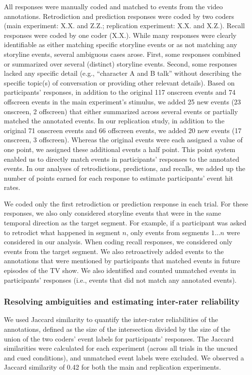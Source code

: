 \documentclass[10pt]{article}
\begin{document}
 All responses were manually coded and matched to events from the video annotations. Retrodiction and prediction responses were coded by two coders (main experiment: X.X. and Z.Z.; replication experiment: X.X. and X.Z.). Recall responses were coded by one coder (X.X.). While many responses were clearly identifiable as either matching specific storyline events or as not matching any storyline events, several ambiguous cases arose. First, some responses combined or summarized over several (distinct) storyline events. Second, some responses lacked any specific detail (e.g., ``character A and B talk'' without describing the specific topic(s) of conversation or providing other relevant details). Based on participants' responses, in addition to the original 117 onscreen events and 74 offscreen events in the main experiment's stimulus, we added 25 new events (23 onscreen, 2 offscreen) that either summarized across several events or partially matched the annotated events. In our replication study, in addition to the original 71 onscreen events and 66 offscreen events, we added 20 new events (17 onscreen, 3 offscreen). Whereas the original events were each assigned a value of one point, we assigned these additional events a half point. This point system enabled us to directly match events in participants' responses to the annotated events. In our analyses of retrodictions, predictions, and recalls, we added up the number of points earned for each response to estimate participants' event hit rates.

We coded only the first retrodiction or prediction response in each trial. For these responses, we also only considered storyline events that were in the same temporal direction as the target segment. For example, if a participant was asked to retrodict what happened in segment $n$, only events from segments $1...n$ were considered in our analysis. When coding recall responses, we considered only events from the target segment.  We also retroactively added events to the annotations that were mentioned by participants that matched events in future episodes of the TV show.  We also identified and counted unmatched events in participants' responses (i.e., events that did not match any annotated events). 

\subsubsection*{Resolving ambiguities and estimating inter-rater reliability}

We used Jaccard similarity to quantify the inter-rater reliabilities of the annotations, defined as the size of the intersection divided by the size of the union of the two coders' event labels for participants' responses. The Jaccard similarities were calculated for each experiment (across all trials in the uncued and cued conditions), and unmatched event labels were excluded. We observed a Jaccard similarity of 0.42 for both the main and replication experiments.
\end{document}
